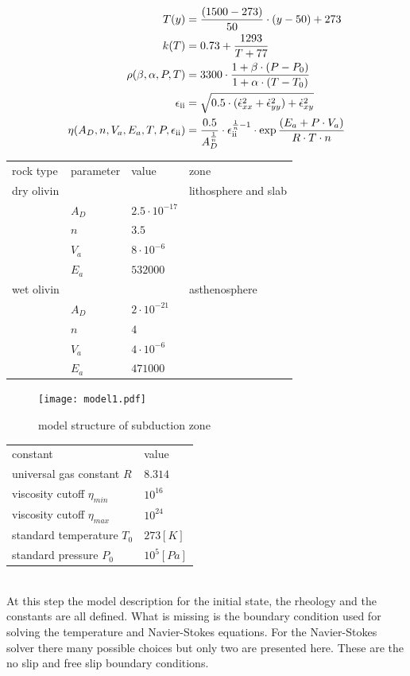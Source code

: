 \documentclass[12pt]{scrartcl}
\newcommand{\RN}[1]{%
  \textup{\uppercase\expandafter{\romannumeral#1}}%
}
\begin{document}
\begin{align}
T(y) &= \frac{(1500 - 273)}{50} \cdot (y - 50) + 273\\
k(T) &= 0.73 + \frac{1293}{T+77}\\
\rho(\beta,\alpha,P,T)&=3300\cdot \frac{1+\beta \cdot (P-P_0)}{1+\alpha \cdot (T-T_0)}\\
\epsilon_{\RN{2}}&=\sqrt{0.5\cdot(\dot{\epsilon}_{xx}^2+\dot{\epsilon}_{yy}^2)+\dot{\epsilon}_{xy}^2 }\\
\eta(A_D,n,V_a,E_a,T,P,\epsilon_{\RN{2}})&=\frac{0.5}{A_D^{\frac{1}{n}}}\cdot \epsilon_{\RN{2}}^{\frac{1}{n}-1}\cdot \exp{\frac{(E_a+P\cdot V_a)}{R\cdot T \cdot n}}
\end{align}

\begin{tabular}{llll}
rock type&parameter&value&zone\\
dry olivin&&&lithosphere and slab\\
&$A_D$&$2.5\cdot 10^{-17}$&\\
&$n$&$3.5$&\\
&$V_a$&$8\cdot 10^{-6}$&\\
&$E_a$&$532000$&\\
wet olivin&&&asthenosphere\\
&$A_D$&$2\cdot 10^{-21}$&\\
&$n$&$4$&\\
&$V_a$&$4\cdot 10^{-6}$&\\
&$E_a$&$471000$&\\
\end{tabular}

\begin{figure}
\texttt{[image: model1.pdf]}
\caption{model structure of subduction zone}
\label{fig:modelsubductionzone}
\end{figure}

\begin{tabular}{ll}
constant&value\\
universal gas constant $R$&$8.314$\\
viscosity cutoff $\eta_{min}$&$10^{16}$\\
viscosity cutoff $\eta_{max}$&$10^{24}$\\
standard temperature $T_0$&$273[K]$\\
standard pressure $P_0$&$10^5 [Pa]$\\
\end{tabular}\\

At this step the model description for the initial state, the rheology and the constants are all defined. What is missing is the boundary condition used for solving the temperature and Navier-Stokes equations. For the Navier-Stokes solver there many possible choices but only two are presented here. These are the no slip and free slip boundary conditions.\\ 
\end{document}
